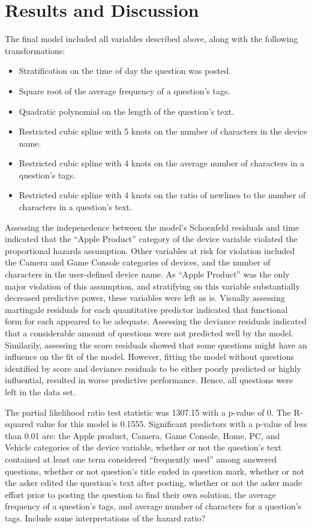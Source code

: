 \documentclass[12pt]{article}
\begin{document}
\section{Results and Discussion} 

The final model included all variables described above, along with the following transformations: 

\begin{itemize}
  \item Stratification on the time of day the question was posted. 
  \item Square root of the average frequency of a question's tags. 
  \item Quadratic polynomial on the length of the question's text. 
  \item Restricted cubic spline with 5 knots on the number of characters in the device name.
  \item Restricted cubic spline with 4 knots on the average number of characters in a question's tags.
  \item Restricted cubic spline with 4 knots on the ratio of newlines to the number of characters in a question's text. 
\end{itemize}

Assessing the indepenedence between the model's Schoenfeld residuals and time indicated that the ``Apple Product'' category of the device variable violated the proportional hazards assumption. Other variables at risk for violation included the Camera and Game Console categories of devices, and the number of characters in the user-defined device name. As ``Apple Product'' was the only major violation of this assumption, and stratifying on this variable substantially decreased predictive power, these variables were left as is. 
Visually assessing martingale residuals for each quantitative predictor indicated that functional form for each appeared to be adequate. Assessing the deviance residuals indicated that a considerable amount of questions were not predicted well by the model. Similarily, assessing the score residuals showed that some questions might have an influence on the fit of the model. However, fitting the model without questions identified by score and deviance residuals to be either poorly predicted or highly influential, resulted in worse predictive performance. Hence, all questions were left in the data set.

The partial likelihood ratio test statistic was 1307.15 with a p-value of 0. The R-squared value for this model is 0.1555. Significant predictors with a p-value of less than 0.01 are: the Apple product, Camera, Game Console, Home, PC, and Vehicle categories of the device variable, whether or not the question's text contained at least one term considered ``frequently used'' among answered questions, whether or not question's title ended in question mark, whether or not the asker edited the question's text after posting, whether or not the asker made effort prior to posting the question to find their own solution, the average frequency of a question's tags, and average number of characters for a question's tags. Include some interpretations of the hazard ratio? 
\end{document}
